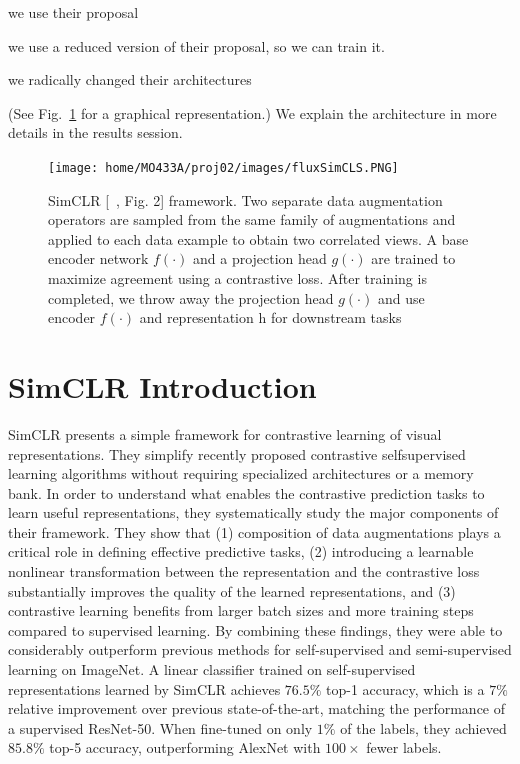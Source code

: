 \documentclass[]{IEEEtran}
\begin{document}
we use their proposal 

we use a reduced version of their proposal, so we can train it. 

we radically changed their architectures 

(See Fig.~\ref{fig01} for a graphical representation.) 
We explain the architecture in more details in the results session. 
\begin{figure}[!h]
\centering
\texttt{[image: home/MO433A/proj02/images/fluxSimCLS.PNG]}
\caption{SimCLR [~\cite{chen2020simple}, Fig. 2] framework. Two separate data augmentation operators are sampled from the same family of augmentations and applied to each data example to obtain two correlated views. A base encoder network $f(\cdot)$ and a projection head $g(\cdot)$ are trained to maximize agreement using a contrastive loss. After training is completed, we throw away the projection head $g(\cdot)$ and use encoder $f(\cdot)$ and representation h for downstream tasks}
\label{fig01}
\end{figure}


\section{SimCLR Introduction}
SimCLR presents a simple framework for contrastive learning of visual representations. They simplify recently proposed contrastive selfsupervised learning algorithms without requiring specialized architectures or a memory bank. In order to understand what enables the contrastive prediction tasks to learn useful representations, they systematically study the major components of their framework. They show that (1) composition of data augmentations plays a critical role in defining effective predictive tasks, (2) introducing a learnable nonlinear transformation between the representation and the contrastive loss substantially improves the quality of the learned representations, and (3) contrastive learning benefits from larger batch sizes and more training steps compared to supervised learning. By combining these findings, they were able to considerably outperform previous methods for self-supervised and semi-supervised learning on ImageNet. A linear classifier trained on self-supervised representations learned by SimCLR achieves $76.5 \%$ top-1 accuracy, which is a $7\%$ relative improvement over previous state-of-the-art, matching the performance of a supervised ResNet-50. When fine-tuned on only $1\%$ of the labels, they achieved $85.8 \%$ top-5 accuracy, outperforming AlexNet with $100 \times$ fewer labels.
\end{document}
